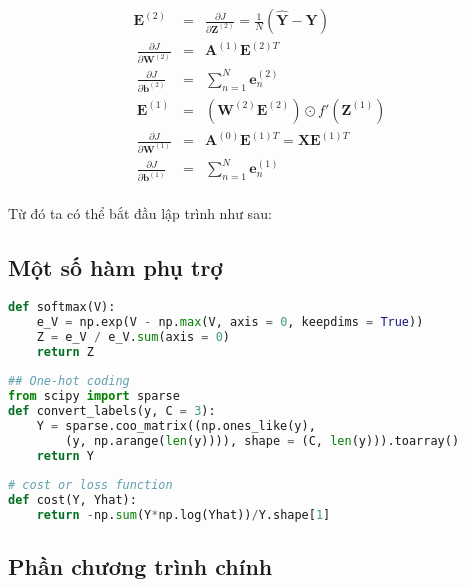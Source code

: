 \begin{eqnarray} 
\mathbf{E}^{(2)} &=& \frac{\partial J}{\partial \mathbf{Z}^{(2)}} =\frac{1}{N}(\mathbf{\hat{Y}} - \mathbf{Y}) \\\ 
\frac{\partial J}{\partial \mathbf{W}^{(2)}} &=& \mathbf{A}^{(1)}  \mathbf{E}^{(2)T} \\\ 
\frac{\partial J}{\partial \mathbf{b}^{(2)}} &=& \sum_{n=1}^N\mathbf{e}_n^{(2)} \\\ 
\mathbf{E}^{(1)} &=& \left(\mathbf{W}^{(2)}\mathbf{E}^{(2)}\right) \odot f'(\mathbf{Z}^{(1)}) \\\ 
\frac{\partial J}{\partial \mathbf{W}^{(1)}} &=& \mathbf{A}^{(0)}  \mathbf{E}^{(1)T} = \mathbf{X}\mathbf{E}^{(1)T}\\\ 
\frac{\partial J}{\partial \mathbf{b}^{(1)}} &=& \sum_{n=1}^N\mathbf{e}_n^{(1)} \\\ 
\end{eqnarray} 
 
Từ đó ta có thể bắt đầu lập trình như sau: 
 
 
\subsection{Một số hàm phụ trợ}
 
\begin{lstlisting}[language=Python]
def softmax(V): 
    e_V = np.exp(V - np.max(V, axis = 0, keepdims = True)) 
    Z = e_V / e_V.sum(axis = 0) 
    return Z 
 
## One-hot coding 
from scipy import sparse 
def convert_labels(y, C = 3): 
    Y = sparse.coo_matrix((np.ones_like(y), 
        (y, np.arange(len(y)))), shape = (C, len(y))).toarray() 
    return Y 
 
# cost or loss function 
def cost(Y, Yhat): 
    return -np.sum(Y*np.log(Yhat))/Y.shape[1] 
\end{lstlisting}
 
 
 
\subsection{Phần chương trình chính}
 
